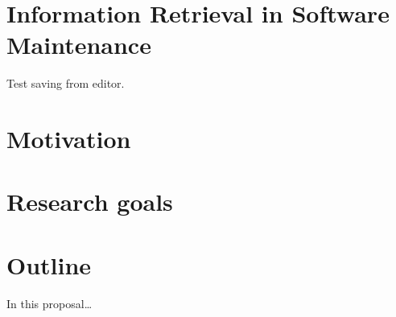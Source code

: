 \section{Information Retrieval in Software
Maintenance}\label{information-retrieval-in-software-maintenance}

Test saving from editor.


\section{Motivation}\label{motivation}

\section{Research goals}\label{research-goals}

\section{Outline}\label{outline}

In this proposal\ldots{}
